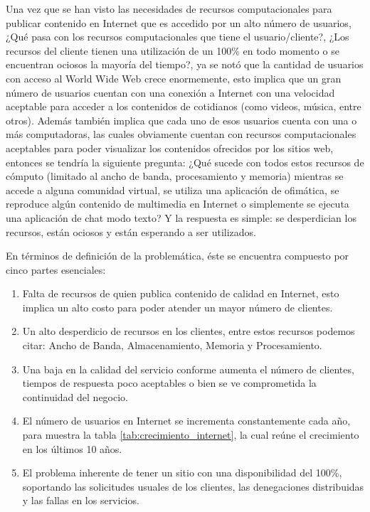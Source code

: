 Una vez que se han visto las necesidades de recursos computacionales para publicar contenido en Internet que es accedido por un alto número de usuarios, ¿Qué pasa con los recursos computacionales que tiene el usuario/cliente?, ¿Los recursos del cliente tienen una utilización de un 100\% en todo momento o se encuentran ociosos la mayoría del tiempo?, ya se notó que la cantidad de usuarios con acceso al World Wide Web crece enormemente, esto implica que un gran número de usuarios cuentan con una conexión a Internet con una velocidad aceptable para acceder a los contenidos de cotidianos (como videos, música, entre otros). Además también implica que cada uno de esos usuarios cuenta con una o más computadoras, las cuales obviamente cuentan con recursos computacionales aceptables para poder visualizar los contenidos ofrecidos por los sitios web, entonces se tendría la siguiente pregunta: ¿Qué sucede con todos estos recursos de cómputo (limitado al ancho de banda, procesamiento y memoria) mientras se accede a alguna comunidad virtual, se utiliza una aplicación de ofimática, se reproduce algún contenido de multimedia en Internet o simplemente se ejecuta una aplicación de chat modo texto?  Y la respuesta es simple: se desperdician los recursos, están ociosos y están esperando a ser utilizados.

En términos de definición de la problemática, éste se encuentra compuesto por cinco partes esenciales:
\begin{enumerate}
\item Falta de recursos de quien publica contenido de calidad en Internet, esto implica un alto costo para poder atender un mayor número de clientes.
\item Un alto desperdicio de recursos en los clientes, entre estos recursos podemos citar: Ancho de Banda, Almacenamiento, Memoria y Procesamiento.
\item Una baja en la calidad del servicio conforme aumenta el número de clientes, tiempos de respuesta poco aceptables o bien se ve comprometida la continuidad del negocio. 
\item El número de usuarios en Internet se incrementa constantemente cada año, para muestra la tabla \ref{tab:crecimiento_internet}, la cual reúne el crecimiento en los últimos 10 años.
\item El problema inherente de tener un sitio con una disponibilidad del 100\%, soportando las solicitudes usuales de los clientes, las denegaciones distribuidas y las fallas en los servicios. 
\end{enumerate}

